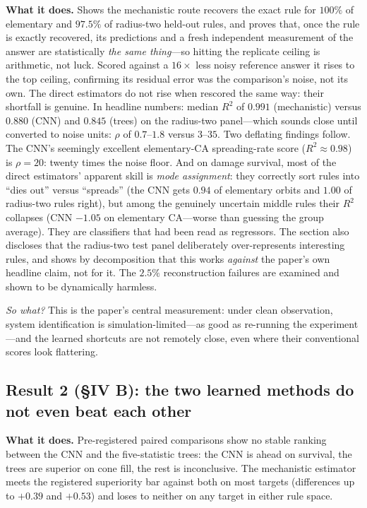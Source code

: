 \documentclass[11pt,a4paper]{article}
\newcommand{\sowhat}[1]{\emph{So what?} #1}
\begin{document}
\textbf{What it does.} Shows the mechanistic route recovers the exact rule
for $100\%$ of elementary and $97.5\%$ of radius-two held-out rules, and
proves that, once the rule is exactly recovered, its predictions and a fresh
independent measurement of the answer are statistically \emph{the same
thing}---so hitting the replicate ceiling is arithmetic, not luck. Scored
against a $16\times$ less noisy reference answer it rises to the top
ceiling, confirming its residual error was the comparison's noise, not its
own. The direct estimators do not rise when rescored the same way: their
shortfall is genuine. In headline numbers: median $R^2$ of $0.991$
(mechanistic) versus $0.880$ (CNN) and $0.845$ (trees) on the radius-two
panel---which sounds close until converted to noise units: $\rho$ of
$0.7$--$1.8$ versus $3$--$35$. Two deflating findings follow. The CNN's
seemingly excellent elementary-CA spreading-rate score ($R^2\approx0.98$)
is $\rho=20$: twenty times the noise floor. And on damage survival, most of
the direct estimators' apparent skill is \emph{mode assignment}: they
correctly sort rules into ``dies out'' versus ``spreads'' (the CNN gets
$0.94$ of elementary orbits and $1.00$ of radius-two rules right), but among
the genuinely uncertain middle rules their $R^2$ collapses (CNN $-1.05$ on
elementary CA---worse than guessing the group average). They are
classifiers that had been read as regressors. The section also discloses
that the radius-two test panel deliberately over-represents interesting
rules, and shows by decomposition that this works \emph{against} the paper's
own headline claim, not for it. The $2.5\%$ reconstruction failures are
examined and shown to be dynamically harmless.

\sowhat{This is the paper's central measurement: under clean observation,
system identification is simulation-limited---as good as re-running the
experiment---and the learned shortcuts are not remotely close, even where
their conventional scores look flattering.}

\subsection*{Result 2 (\S IV B): the two learned methods do not even beat each other}

\textbf{What it does.} Pre-registered paired comparisons show no stable
ranking between the CNN and the five-statistic trees: the CNN is ahead on
survival, the trees are superior on cone fill, the rest is inconclusive.
The mechanistic estimator meets the registered superiority bar against both
on most targets (differences up to $+0.39$ and $+0.53$) and loses to
neither on any target in either rule space.
\end{document}
